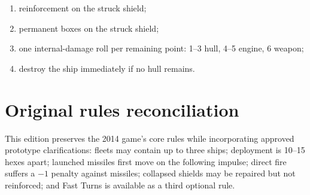 \begin{enumerate}
  \item reinforcement on the struck shield;
  \item permanent boxes on the struck shield;
  \item one internal-damage roll per remaining point: 1--3 hull, 4--5 engine, 6 weapon;
  \item destroy the ship immediately if no hull remains.
\end{enumerate}

\section{Original rules reconciliation}

This edition preserves the 2014 game's core rules while incorporating approved prototype clarifications: fleets may contain up to three ships; deployment is 10--15 hexes apart; launched missiles first move on the following impulse; direct fire suffers a $-1$ penalty against missiles; collapsed shields may be repaired but not reinforced; and Fast Turns is available as a third optional rule.
